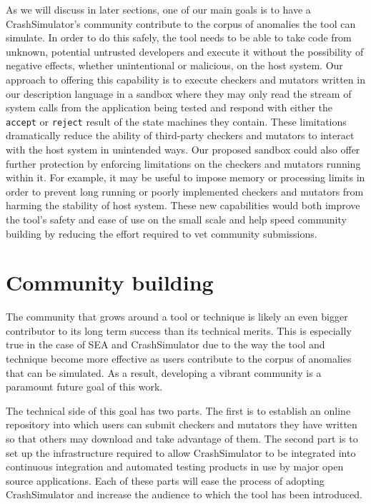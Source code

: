 \documentclass[twocolumn]{article}
\begin{document}
As we will discuss in later sections, one of our main goals is to have a
CrashSimulator's community contribute to the corpus of anomalies the tool
can simulate.  In order to do this safely, the tool needs to be able to
take code from unknown, potential untrusted developers and execute it
without the possibility of negative effects, whether unintentional or
malicious, on the host system.  Our approach to offering this capability is
to execute checkers and mutators written in our description language in a
sandbox where they may only read the stream of system calls
from the application being tested and respond with either the {\tt accept} or
{\tt reject} result of the state machines they contain.  These limitations
dramatically reduce the ability of third-party checkers and mutators to
interact with the host system in unintended ways.
Our proposed sandbox could also offer further protection by enforcing
limitations on the checkers and mutators running within it.  For example,
it may be useful to impose memory or processing limits in order to prevent
long running or poorly implemented checkers and mutators from harming the
stability of host system.  These new capabilities would both improve the
tool's safety and ease of use on the small scale and help speed
community building by reducing the effort required to vet
community submissions.


\section{Community building}

The community that grows around a tool or technique is likely an even
bigger contributor to its long term success than its technical merits.
This is especially true in the case of SEA and CrashSimulator due to the
way the tool and technique become more effective as users contribute to the
corpus of anomalies that can be simulated.  As a result, developing a
vibrant community is a paramount future goal of this work.

The technical side of this goal has two parts.  The first is to establish
an online repository into which users can submit checkers and mutators they
have written so that others may download and take advantage of them.  The
second part is to set up the infrastructure required to allow
CrashSimulator to be integrated into continuous integration and automated
testing products in use by major open source applications.  Each of these
parts will ease the process of adopting CrashSimulator and increase the
audience to which the tool has been introduced.
\end{document}
